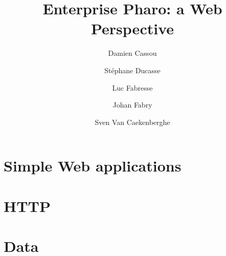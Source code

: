 \documentclass[10pt,twoside,showtrims]{support/latex/sbabook}
\title{Enterprise Pharo: a Web Perspective}
\author{
    Damien Cassou \and
    Stéphane Ducasse \and
    Luc Fabresse \and
    Johan Fabry \and
    Sven Van Caekenberghe}
\begin{document}
\begin{titlingpage}
    \setlength\droptitle{5cm}
    \pretitle{\begin{flushright}\HUGE\sffamily}
    \posttitle{\par\end{flushright}\vskip 1cm}
    \postauthor{\end{tabular}\par}
    \maketitle
\end{titlingpage}

\frontmatter


\tableofcontents

\sloppy %
\mainmatter

\part{Simple Web applications}







\part{HTTP}














\part{Data}










\end{document}

